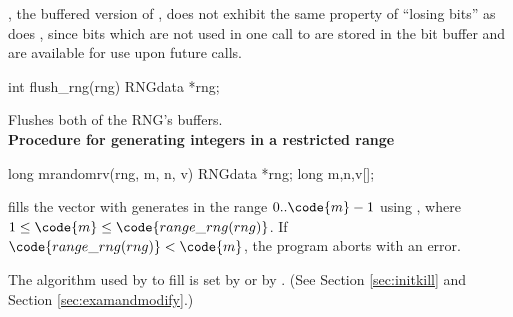 , the buffered version of , does not
exhibit the same property of ``losing bits'' as does , since
bits which are not used in one call to  are stored in the bit
buffer and are available for use upon future calls.\\

\begin{example}
	int flush_rng(rng)
	RNGdata *rng;\\
\end{example}

	Flushes both of the RNG's buffers.\\

\noindent
{\bf Procedure for generating integers in a restricted range\\}
\label{sec:mrandomrv}

\begin{example}
	long mrandomrv(rng, m, n, v)
	RNGdata *rng;
	long m,n,v[];\\
\end{example}

\begin{tex}
 fills the vector  with  generates in
the range $0..\code{m}-1$ using , where $1 \leq \code{m} \leq
\code{range\_rng(rng)}$.  If $\code{range\_rng(rng)} < \code{m}$, the
program aborts with an error.
\end{tex}

The algorithm used by  to fill  is set by
 or by .  (See Section \ref{sec:initkill}
and Section \ref{sec:examandmodify}.)

